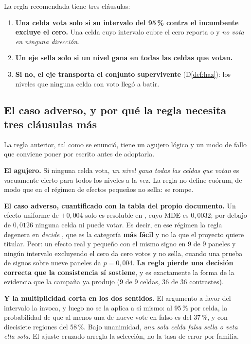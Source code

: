 La regla recomendada tiene tres cláusulas:

\begin{enumerate}[leftmargin=1.5em,itemsep=0.35em]
  \item \textbf{Una celda vota solo si su intervalo del 95\,\% contra el incumbente
        excluye el cero.} Una celda cuyo intervalo cubre el cero reporta
         o  y \emph{no vota en ninguna
        dirección}.
  \item \textbf{Un eje sella solo si un nivel gana en todas las celdas que votan.}
  \item \textbf{Si no, el eje transporta el conjunto supervivente}
        (D\ref{def:haz}): los niveles que ninguna celda con voto llegó a batir.
\end{enumerate}

\subsection{El caso adverso, y por qué la regla necesita tres cláusulas más}

La regla anterior, tal como se enunció, tiene un agujero lógico y un modo de fallo
que conviene poner por escrito antes de adoptarla.

\textbf{El agujero.} Si ninguna celda vota, \emph{un nivel gana todas las celdas
que votan} es vacuamente cierto para todos los niveles a la vez. La regla no define
cuórum, de modo que en el régimen de efectos pequeños no sella: se rompe.

\textbf{El caso adverso, cuantificado con la tabla del propio documento.} Un efecto
uniforme de $+0{,}004$ solo es resoluble en , cuyo MDE es $0{,}0032$;
por debajo de $0{,}0126$ ninguna celda  ni  puede votar. Es decir,
en ese régimen la regla degenera en \emph{decide }, que es la categoría
\textbf{más fácil} y no la que el proyecto quiere titular. Peor: un efecto real y
pequeño con el mismo signo en 9 de 9 paneles y ningún intervalo excluyendo el cero
da cero votos y no sella, cuando una prueba de signos sobre nueve paneles da
$p = 0{,}004$. \textbf{La regla pierde una decisión correcta que la consistencia sí
sostiene}, y es exactamente la forma de la evidencia que la campaña ya produjo
(9 de 9 celdas, 36 de 36 contrastes).

\textbf{Y la multiplicidad corta en los dos sentidos.} El argumento a favor del
intervalo la invoca, y luego no se la aplica a sí mismo: al 95\,\% por celda, la
probabilidad de que al menos una de nueve vote en falso es del 37\,\%, y con
diecisiete regiones del 58\,\%. Bajo unanimidad, \emph{una sola celda falsa sella o
veta ella sola}. El ajuste cruzado arregla la selección, no la tasa de error por
familia.


